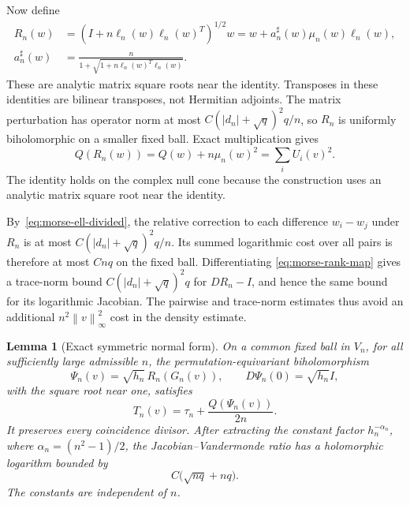 \documentclass[11pt]{article}
\numberwithin{equation}{section}
\newtheorem{lemma}[theorem]{Lemma}
\theoremstyle{definition}
\newcommand{\norm}[1]{\left\lVert#1\right\rVert}
\begin{document}
Now define
\begin{align}
 R_n(w)&=\left(I+n\ell_n(w)\ell_n(w)^T\right)^{1/2}w
        =w+a_n^\sharp(w)\mu_n(w)\ell_n(w),\label{eq:morse-rank-map}\\
 a_n^\sharp(w)&=\frac n{1+\sqrt{1+n\ell_n(w)^T\ell_n(w)}}.
 \label{eq:morse-rank-coefficient}
\end{align}
These are analytic matrix square roots near the identity.  Transposes in
these identities are bilinear transposes, not Hermitian adjoints.  The
matrix perturbation has operator norm at most
$C(|d_n|+\sqrt q)^2q/n$, so $R_n$ is uniformly biholomorphic on a
smaller fixed ball.  Exact multiplication gives
\begin{equation}
 Q(R_n(w))=Q(w)+n\mu_n(w)^2=\sum_iU_i(v)^2.
 \label{eq:morse-rank-energy}
\end{equation}
The identity holds on the complex null cone because the construction
uses an analytic matrix square root near the identity.

By~\eqref{eq:morse-ell-divided}, the relative correction to each
difference $w_i-w_j$ under $R_n$ is at most
$C(|d_n|+\sqrt q)^2q/n$.  Its summed logarithmic cost over all pairs
is therefore at most $Cnq$ on the fixed ball.  Differentiating
\eqref{eq:morse-rank-map} gives a trace-norm bound
$C(|d_n|+\sqrt q)^2q$ for $DR_n-I$, and hence the same bound for its
logarithmic Jacobian.  The pairwise and trace-norm estimates thus avoid an additional
$n^2\norm v_\infty^2$ cost in the density estimate.

\begin{lemma}[Exact symmetric normal form]
\label{lem:negative-morse}
On a common fixed ball in $V_n$, for all sufficiently large admissible
$n$, the permutation-equivariant biholomorphism
\begin{equation}
 \Psi_n(v)=\sqrt{h_n}\,R_n(G_n(v)),
 \qquad D\Psi_n(0)=\sqrt{h_n}I,
 \label{eq:morse-final-map}
\end{equation}
with the square root near one, satisfies
\begin{equation}
 \boxed{T_n(v)=\tau_n+\frac{Q(\Psi_n(v))}{2n}.}
 \label{eq:morse-exact-normal-form}
\end{equation}
It preserves every coincidence divisor.  After extracting the constant
factor $h_n^{-\alpha_n}$, where $\alpha_n=(n^2-1)/2$, the
Jacobian--Vandermonde ratio has a holomorphic logarithm bounded by
\begin{equation}
 C\bigl(\sqrt{nq}+nq\bigr).
 \label{eq:morse-geometric-density}
\end{equation}
The constants are independent of $n$.
\end{lemma}
\end{document}
